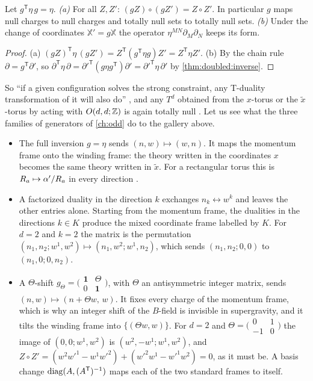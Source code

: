 \begin{proposition}\label{thm:doubled:covariance}
Let $g^{\mathsf T}\eta\,g=\eta$. \emph{(a)} For all $Z,Z'$: $(gZ)\circ(gZ')=Z\circ Z'$. In
particular $g$ maps null charges to null charges and totally null sets to totally null sets.
\emph{(b)} Under the change of coordinates $\mathbb X'=g\mathbb X$ the operator
$\eta^{MN}\partial_M\partial_N$ keeps its form.
\end{proposition}
\begin{proof}
(a) $(gZ)^{\mathsf T}\eta\,(gZ')=Z^{\mathsf T}(g^{\mathsf T}\eta g)Z'=Z^{\mathsf T}\eta Z'$.
(b) By the chain rule $\partial=g^{\mathsf T}\partial'$, so $\partial^{\mathsf T}\eta\,\partial
=\partial'^{\mathsf T}(g\eta g^{\mathsf T})\partial'=\partial'^{\mathsf T}\eta\,\partial'$ by
\cref{thm:doubled:inverse}.
\end{proof}

So ``if a given configuration solves the strong constraint, any T-duality transformation of it
will also do'' , and any $T^d$ obtained from the $x$-torus or
the $\tilde x$-torus by acting with $O(d,d;\mathbb{Z})$ is again totally null . Let us see what the three families of generators of \cref{ch:odd} do to the
gallery above.

\begin{itemize}[leftmargin=*]
\item The full inversion $g=\eta$ sends $(n,w)\mapsto(w,n)$. It maps the momentum frame onto
 the winding frame: the theory written in the coordinates $x$ becomes the same theory written in
 $\tilde x$. For a rectangular torus this is $R_a\mapsto\alpha'/R_a$ in every direction
 .
\item A factorized duality in the direction $k$ exchanges $n_k\leftrightarrow w^k$ and leaves
 the other entries alone. Starting from the momentum frame, the dualities in the directions
 $k\in K$ produce the mixed coordinate frame labelled by $K$. For $d=2$ and $k=2$ the matrix is
 the permutation $(n_1,n_2;w^1,w^2)\mapsto(n_1,w^2;w^1,n_2)$, which sends $(n_1,n_2;0,0)$ to
 $(n_1,0;0,n_2)$.
\item A $\Theta$-shift $g_\Theta=\bigl(\begin{smallmatrix}\mathbf 1&\Theta\\0&\mathbf
 1\end{smallmatrix}\bigr)$, with $\Theta$ an antisymmetric integer matrix, sends
 $(n,w)\mapsto(n+\Theta w,\,w)$. It fixes every charge of the momentum frame, which is why an
 integer shift of the $B$-field is invisible in supergravity, and it tilts the winding frame
 into $\{(\Theta w,w)\}$. For $d=2$ and $\Theta=\bigl(\begin{smallmatrix}0&1\\-1&0
 \end{smallmatrix}\bigr)$ the image of $(0,0;w^1,w^2)$ is $(w^2,-w^1;w^1,w^2)$, and
 $Z\circ Z'=(w^2w'^1-w^1w'^2)+(w'^2w^1-w'^1w^2)=0$, as it must be.
 A basis change $\operatorname{diag}(A,(A^{\mathsf T})^{-1})$ maps each of the two standard frames to
 itself.
\end{itemize}


